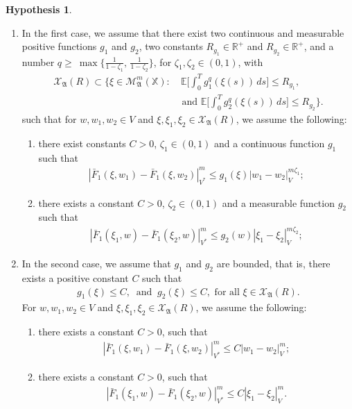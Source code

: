 \documentclass[english,a4paper,11pt]{amsart}
\theoremstyle{plain}
\theoremstyle{definition}
\newtheorem{hypo}[theorem]{Hypothesis}
\theoremstyle{remark}
\numberwithin{equation}{section}
\newcommand{\MA}{\mathfrak{A}}
\newcommand{\RR}{{\mathbb{R}}}
\newcommand{\EE}{ \mathbb{E} }
\newcommand{\Xcal} {{\mathcal X}}
\newcommand{\X}{\mathbb{X}}
\begin{document}
\begin{hypo}
\begin{enumerate}
\item[(H.3)$_1$]
In the first case, we assume that there exist
two continuous and measurable positive functions  $g_1$ and $g_2$, two constants   $R_{g_1}\in\RR^+$ and $R_{g_2}\in\RR^+$, and {a number $q \ge\ \max\!\big\{\tfrac{1}{1-\zeta_1},\,\tfrac{1}{1-\zeta_2}\big\}$, for $\zeta_1,\zeta_2\in (0,1)$,} with
\begin{align}\label{Condition}\nonumber
	\mathcal{X}_\MA(R) \subset \bigg\{\xi \in \mathcal{M}_\MA^m(\X): &\ \EE \bigg[\int_0^Tg_1^q(\xi(s))\,ds \bigg]\leq R_{g_1},\\& \text{ and } \EE \bigg[\int_0^Tg_2^q(\xi(s))\,ds \bigg]\leq R_{g_2} \bigg\}.
\end{align}
such that for  $w,w_1, w_2\in V$ and $\xi,\xi_1,\xi_2\in \mathcal{X}_\MA(R)$, we assume the following:
\begin{enumerate}
	\item there exist constants $C>0$, $\zeta_1\in(0,1)$ and a continuous function $g_1$ such that 
	\begin{align*}
		|\bar F_1(\xi,w_1)-\bar  F_1(\xi,w_2)|_{V^\ast}^m\leq g_1(\xi)|w_1-w_2|_V^{m\zeta_1};
	\end{align*}
\item there exists a constant $C>0$, $\zeta_2\in(0,1)$ and a measurable function $g_2$ such that 
	\begin{align*}
	|\bar  F_1(\xi_1,w)-\bar  F_1(\xi_2,w)|_{V^\ast}^m\leq g_2(w)|\xi_1-\xi_2|_V^{m\zeta_2};
\end{align*}
\end{enumerate}
\item[(H.3)$_2$] In the second case, we assume that $g_1$ and $g_2$ are bounded, that is, there exists a positive constant $C$ such that 
\begin{align*}
	g_1(\xi)\leq C, \ \text{ and } \ g_2(\xi)\leq C, \text{ for all } \xi\in\Xcal_\MA(R). 
\end{align*} For $w,w_1, w_2\in V$ and $\xi,\xi_1,\xi_2\in \mathcal{X}_\MA(R)$, we assume the following:
\begin{enumerate}
	\item there exists a constant $C>0$,  such that 
	\begin{align*}
		|\bar F_1(\xi,w_1)-\bar  F_1(\xi,w_2)|_{V^\ast}^m\leq C|w_1-w_2|_V^{m};
	\end{align*}
	\item there exists a constant $C>0$, such that 
	\begin{align*}
		|\bar  F_1(\xi_1,w)-\bar  F_1(\xi_2,w)|_{V^\ast}^m\leq C|\xi_1-\xi_2|_V^{m}.
	\end{align*}
\end{enumerate}
\end{enumerate}
\end{hypo}
\end{document}
